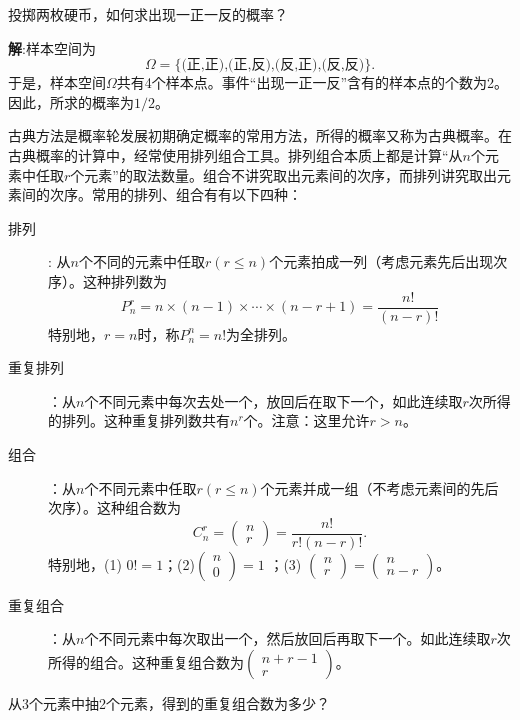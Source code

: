 \begin{example}
        投掷两枚硬币，如何求出现一正一反的概率？

        {\textbf{解}}:\quad 样本空间为$$\Omega= \{\text{(正,正),(正,反),(反,正),(反,反)} \}.$$于是，样本空间$\Omega$共有4个样本点。事件“出现一正一反”含有的样本点的个数为2。因此，所求的概率为$1/2$。
    \end{example}
古典方法是概率轮发展初期确定概率的常用方法，所得的概率又称为古典概率。在古典概率的计算中，经常使用排列组合工具。排列组合本质上都是计算“从$n$个元素中任取$r$个元素”的取法数量。组合不讲究取出元素间的次序，而排列讲究取出元素间的次序。常用的排列、组合有有以下四种：
 \begin{description}
        \item[排列]: 从$n$个不同的元素中任取$r(r\leq n)$个元素拍成一列（考虑元素先后出现次序）。这种排列数为
        $$P_n^r
        = n\times (n-1)\times \cdots \times (n-r+1) = \frac{n!}{(n-r)!}
        $$
        特别地，$r=n$时，称$P_n^n = n!$为全排列。
        \item[重复排列]：从$n$个不同元素中每次去处一个，放回后在取下一个，如此连续取$r$次所得的排列。这种重复排列数共有$n^r$个。注意：这里允许$r>n$。
        \item [组合]：从$n$个不同元素中任取$r(r\leq n)$个元素并成一组（不考虑元素间的先后次序）。这种组合数为$$
        C_n^r = \begin{pmatrix}n\\r\end{pmatrix}= \frac{n!}{r!(n-r)!}.
        $$
        特别地，(1) $0!=1$；(2)$\begin{pmatrix}n\\0\end{pmatrix} = 1$ ；(3) $\begin{pmatrix}n\\r\end{pmatrix}= \begin{pmatrix}n\\n-r\end{pmatrix}$。
        \item[重复组合]：从$n$个不同元素中每次取出一个，然后放回后再取下一个。如此连续取$r$次所得的组合。这种重复组合数为$\begin{pmatrix}n+r-1\\r\end{pmatrix} $。
            \end{description}
        \begin{example}
             从3个元素中抽2个元素，得到的重复组合数为多少？
        \end{example}
